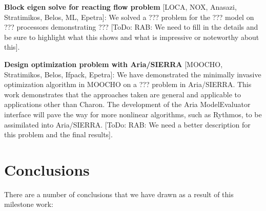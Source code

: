 \documentclass[pdf,ps2pdf,11pt]{SANDreport}
\begin{document}
{}\noindent\textbf{Block eigen solve for reacting flow problem} [LOCA, NOX,
Anasazi, Stratimikos, Belos, ML, Epetra]: We solved a ??? problem for the ??? 
model on ??? processors demonstrating ??? [ToDo: RAB: We need to fill in the
details and be sure to highlight what this shows and what is impressive or
noteworthy about this].

{}\noindent\textbf{Design optimization problem with Aria/SIERRA} [MOOCHO,
Stratimikos, Belos, Ifpack, Epetra]: We have demonstrated the minimally
invasive optimization algorithm in MOOCHO on a ??? problem in Aria/SIERRA.
This work demonstrates that the approaches taken are general and applicable to
applications other than Charon. The development of the Aria ModelEvaluator
interface will pave the way for more nonlinear algorithms, such as Rythmos, to
be assimilated into Aria/SIERRA. [ToDo: RAB: We need a better description for
this problem and the final results].


%
\section{Conclusions}
%

There are a number of conclusions that we have drawn as a result of this
milestone work:
\end{document}
